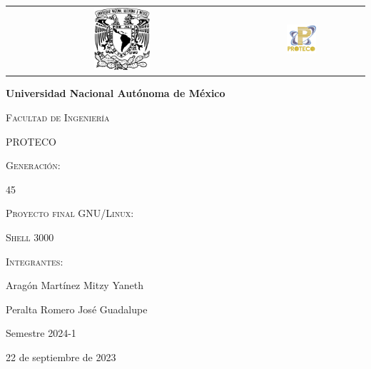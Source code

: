 \documentclass[12pt,a4paper]{article}
\begin{document}
\thispagestyle{empty}
\begin{titlepage}
\centering
\begin{center}
\begin{tabular}{c c}
\includegraphics[width=0.25\textwidth]{img/gg.png}\hspace{5cm}&\hspace{6cm}\includegraphics[width=0.25\textwidth]{img/proteco.png}\\
\end{tabular}
\end{center}

{\bfseries\LARGE Universidad Nacional Autónoma de México \par}
\vspace{1cm}
{\scshape\Large Facultad de Ingeniería \par}
{\scshape\Large PROTECO \par}
\vspace{1.75cm}
{\scshape\Large Generación: \par}
{\Large 45 \par}
\vfill
{\scshape\Large Proyecto final GNU/Linux: \par}
{\scshape\Large Shell 3000 \par}
\vfill
{\scshape\Large Integrantes: \par}
{\Large Aragón Martínez Mitzy Yaneth \par}
{\Large Peralta Romero José Guadalupe \par}
\vfill
{\Large Semestre 2024-1\par}
\vfill
{\Large 22 de septiembre de 2023 \par}
\end{titlepage}
\newpage
\tableofcontents
\newpage 
\end{document}
